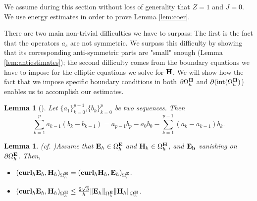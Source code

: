 \documentclass[12pt,reqno]{amsart}
\newcommand{\curl}{{\bf curl}}
\newcommand{\e}{{\bf E}}
\newcommand{\h}{{\bf H}}
\newtheorem{lem}[theorem]{Lemma}
\newtheorem{lemma}[theorem]{Lemma}
\theoremstyle{definition}
\numberwithin{equation}{section}
\newcommand{\intr}[1]{\mathrm{int}(#1)}
\def\Gwh{\Omega_h}
\begin{document}
 We assume during this section without loss of generality that $Z=1$ and $J=0$.
We use energy estimates in order to prove Lemma \ref{lem:coer}.

There are two main non-trivial difficulties we have to surpass:
 The first is the fact that the operators $a_s$ are not symmetric. We surpass this difficulty by showing that its corresponding  anti-symmetric parts are "small" enough (Lemma \ref{lem:antiestimates});
 the second difficulty comes from the boundary equations we have to impose for the elliptic equations   we solve for $\h$.
  We will show how the fact that  we impose specific boundary conditions  in both $\partial \Gwh^\h$ and $\partial (\intr{\Gwh^{\h}}$) enables  us to accomplish our estimates.  
 

\begin{lem}[\cite{Morton}]
Let $\{a_1\}_{k=0}^{p-1}$,$\{b_k\}_{k=0}^{p}$ be two sequences. Then
$$
\sum_{k=1}^{p}a_{k-1}(b_k-b_{k-1})=a_{p-1}b_p-a_{0}b_0-\sum_{k=1}^{p-1}(a_{k}-a_{k-1})b_k.
$$
\end{lem}



\begin{lemma}(cf. \cite[(37)]{sakka} )\label{lem:sym}
	Assume that $\e_h\in \Gwh^\e$ and $\h_h\in \Gwh^\h$, and
	$\bf{E}_h$ vanishing on $\partial \Gwh^{\bf{E}}$. Then,
	\begin{itemize}
		\item  
		$
		(\curl_h\e_h,\h_h)_{\Gwh^\h}=
		(\curl_h\h_h,\e_h)_{\Gwh^\e}.
		$\\[1mm]
		\item $(\curl _h\e_h,\h_h)_{\Gwh^\h}\leq
		  \frac{2\sqrt{3}}{h}\|\e_h\|_{\Gwh^\e}
		\|\h_h\|_{\Gwh^\h}
		$.

	\end{itemize}

\end{lemma}
\end{document}
